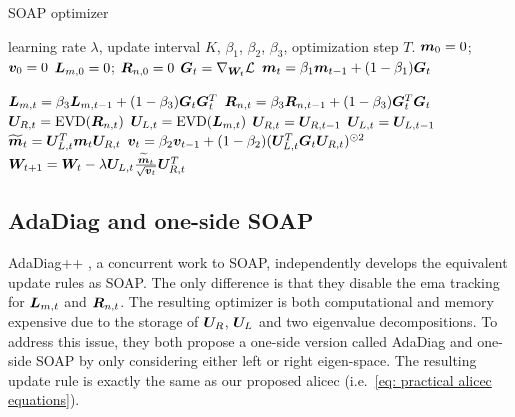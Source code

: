 \begin{algorithm}
    \caption{SOAP optimizer}
    \label{alg: SOAP optimizer}
    \begin{algorithmic}
         learning rate $\lambda$, update interval $K$, $\beta_1$, $\beta_2$, $\beta_3$, optimization step $T$.
        \STATE ${\bm{m}}_0=0$; ${\bm{v}}_0=0$ 
        \STATE ${\bm{L}}_{m,0}=0$; ${\bm{R}}_{n,0}=0$ 
            \STATE ${\bm{G}}_t=\nabla_{{\bm{W}}_t}\mathcal{L}$
            \STATE ${\bm{m}}_t = \beta_1{\bm{m}}_{t-1}+(1-\beta_1){\bm{G}}_t$

            \STATE ${\bm{L}}_{m,t}=\beta_3{\bm{L}}_{m,t-1}+(1-\beta_3){\bm{G}}_t{\bm{G}}_t^T$ 
            \STATE ${\bm{R}}_{n,t}=\beta_3{\bm{R}}_{n,t-1}+(1-\beta_3){\bm{G}}_t^T{\bm{G}}_t$ 
                \STATE ${\bm{U}}_{R,t}=\operatorname{EVD}({\bm{R}}_{n,t})$ 
                \STATE ${\bm{U}}_{L,t}=\operatorname{EVD}({\bm{L}}_{m,t})$ 
            \ELSE
                \STATE ${\bm{U}}_{R,t}={\bm{U}}_{R,t-1}$
                \STATE ${\bm{U}}_{L,t}= {\bm{U}}_{L,t-1}$
            \ENDIF
            \STATE $\widetilde{{\bm{m}}}_t = {\bm{U}}_{L,t}^T{\bm{m}}_t{\bm{U}}_{R,t}$ 
            \STATE ${\bm{v}}_t = \beta_2{\bm{v}}_{t-1}+(1-\beta_2)({\bm{U}}_{L,t}^T{\bm{G}}_t{\bm{U}}_{R,t})^{\odot 2}$ 
            \STATE ${\bm{W}}_{t+1}={\bm{W}}_{t} -\lambda {\bm{U}}_{L,t}\frac{\widetilde{{\bm{m}}}_t}{\sqrt{{\bm{v}}_t}}{\bm{U}}_{R,t}^T$
        \ENDFOR
    \end{algorithmic}
\end{algorithm}

\subsection{AdaDiag and one-side SOAP}
\label{subapp: AdaDiag}
AdaDiag++ \citep{anonymous2024improving}, a concurrent work to SOAP, independently develops the equivalent update rules as SOAP. The only difference is that they disable the \gls{ema} tracking for ${\bm{L}}_{m,t}$ and ${\bm{R}}_{n,t}$. The resulting optimizer is both computational and memory expensive due to the storage of ${\bm{U}}_{R}$, ${\bm{U}}_L$ and two eigenvalue decompositions. To address this issue, they both propose a one-side version called AdaDiag and one-side SOAP by only considering either left or right eigen-space. The resulting update rule is exactly the same as our proposed \gls{alicec} (i.e.~\cref{eq: practical alicec equations}). 

